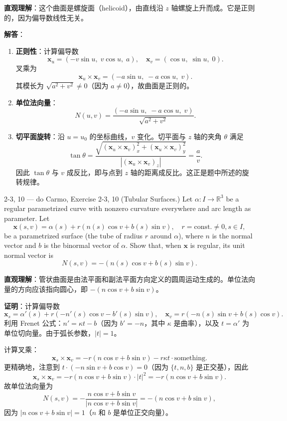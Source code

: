 \begin{solution}
\textbf{直观理解}：这个曲面是螺旋面（helicoid），由直线沿 $z$ 轴螺旋上升而成。它是正则的，因为偏导数线性无关。

\textbf{解答}：
\begin{enumerate}
    \item \textbf{正则性}：计算偏导数
    \[
    \mathbf{x}_u = (-v\sin u,\; v\cos u,\; a), \quad \mathbf{x}_v = (\cos u,\; \sin u,\; 0).
    \]
    叉乘为
    \[
    \mathbf{x}_u \times \mathbf{x}_v = (-a\sin u,\; -a\cos u,\; v).
    \]
    其模长为 $\sqrt{a^2 + v^2} \neq 0$（因为 $a \neq 0$），故曲面是正则的。
    \item \textbf{单位法向量}：
    \[
    N(u,v) = \frac{(-a\sin u,\; -a\cos u,\; v)}{\sqrt{a^2 + v^2}}.
    \]
    \item \textbf{切平面旋转}：沿 $u = u_0$ 的坐标曲线，$v$ 变化。切平面与 $z$ 轴的夹角 $\theta$ 满足
    \[
    \tan\theta = \frac{\sqrt{(\mathbf{x}_u \times \mathbf{x}_v)_x^2 + (\mathbf{x}_u \times \mathbf{x}_v)_y^2}}{|(\mathbf{x}_u \times \mathbf{x}_v)_z|} = \frac{a}{v}.
    \]
    因此 $\tan\theta$ 与 $v$ 成反比，即与点到 $z$ 轴的距离成反比。这正是题中所述的旋转规律。
\end{enumerate}
\end{solution}

\begin{exercise}{2-3, 10 — do Carmo, Exercise 2-3, 10}
(Tubular Surfaces.) Let $\alpha: I \to \mathbb{R}^3$ be a regular parametrized curve with nonzero curvature everywhere and arc length as parameter. Let
\[
\mathbf{x}(s, v) = \alpha(s) + r(n(s) \cos v + b(s) \sin v), \quad r = \mathrm{const.} \neq 0, s \in I,
\]
be a parametrized surface (the tube of radius $r$ around $\alpha$), where $n$ is the normal vector and $b$ is the binormal vector of $\alpha$. Show that, when $\mathbf{x}$ is regular, its unit normal vector is
\[
N(s, v) = -(n(s) \cos v + b(s) \sin v).
\]
\end{exercise}

\begin{solution}
\textbf{直观理解}：管状曲面是由法平面和副法平面方向定义的圆周运动生成的。单位法向量的方向应该指向圆心，即 $-(n\cos v + b\sin v)$。

\textbf{证明}：计算偏导数
\[
\mathbf{x}_s = \alpha'(s) + r(-n'(s)\cos v - b'(s)\sin v), \quad \mathbf{x}_v = r(-n(s)\sin v + b(s)\cos v).
\]
利用 Frenet 公式：$n' = \kappa t - b$（因为 $b' = -n$，其中 $\kappa$ 是曲率），以及 $t = \alpha'$ 为单位切向量。由于弧长参数，$|t| = 1$。

计算叉乘：
\[
\mathbf{x}_s \times \mathbf{x}_v = -r(n\cos v + b\sin v) - r\kappa t \cdot \text{something}.
\]
更精确地，注意到 $t \cdot (-n\sin v + b\cos v) = 0$（因为 $\{t, n, b\}$ 是正交基），因此
\[
\mathbf{x}_s \times \mathbf{x}_v = -r(n\cos v + b\sin v) \cdot |t|^2 = -r(n\cos v + b\sin v).
\]
故单位法向量为
\[
N(s,v) = -\frac{n\cos v + b\sin v}{|n\cos v + b\sin v|} = -(n\cos v + b\sin v),
\]
因为 $|n\cos v + b\sin v| = 1$（$n$ 和 $b$ 是单位正交向量）。
\end{solution}


